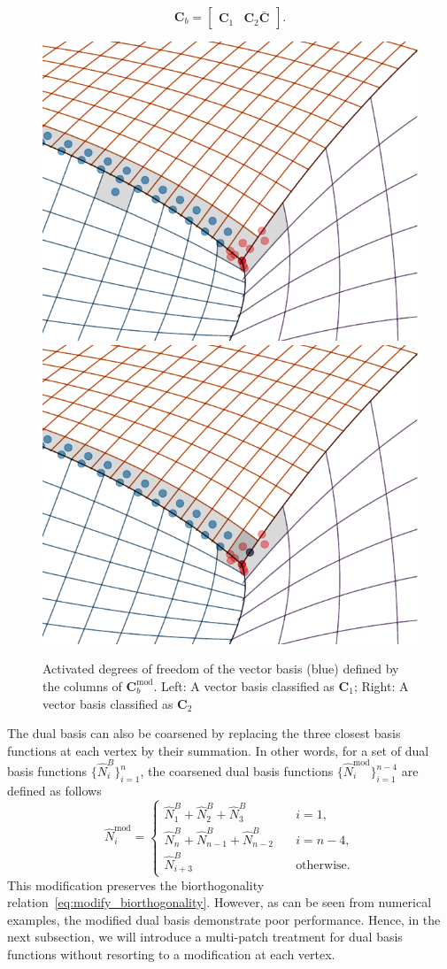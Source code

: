 \begin{equation}
  \mathbf{C}_b =
  \begin{bmatrix}
    \mathbf{C}_1 & \mathbf{C}_2\bar{\mathbf{C}}\label{eq:c_b_matrix}
  \end{bmatrix}.
\end{equation}

\begin{figure}[ht]
  \centering
  \includegraphics[width=.47\linewidth]{trim_nonoverlap_modify}\qquad
  \includegraphics[width=.47\linewidth]{trim_overlap_modify}
  \caption{Activated degrees of freedom of the vector basis (blue) defined by the columns of $\mathbf{C}_b^\text{mod}$. Left: A vector basis classified as $\mathbf{C}_1$; Right: A vector basis classified as $\mathbf{C}_2$}\label{fig:overlap_nonoverlap_modify}
\end{figure}

\begin{remark}
  The \Bezier dual basis can also be coarsened by replacing the three closest basis functions at each vertex by their summation. In other words, for a set of \Bezier dual basis functions $\{\hat{N}^B_i\}_{i=1}^n$, the coarsened \Bezier dual basis functions $\{\hat{N}^\text{mod}_i\}_{i=1}^{n-4}$ are defined as follows
  \begin{equation}
    \hat{N}^\text{mod}_i=
    \begin{cases}
      \hat{N}^B_1+\hat{N}^B_2+\hat{N}^B_3\quad           & i=1,              \\
      \hat{N}^B_{n}+\hat{N}^B_{n-1}+\hat{N}^B_{n-2}\quad & i=n-4,            \\
      \hat{N}^B_{i+3}\quad                               & \text{otherwise}.
    \end{cases}\label{eq:bezier_dual_modification}
  \end{equation}
  This modification preserves the biorthogonality relation~\eqref{eq:modify_biorthogonality}. However, as can be seen from numerical examples, the modified \Bezier dual basis demonstrate poor performance. Hence, in the next subsection, we will introduce a multi-patch treatment for \Bezier dual basis functions without resorting to a modification at each vertex.
\end{remark}

